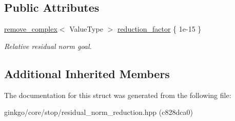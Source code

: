 \subsection*{Public Attributes}
\begin{DoxyCompactItemize}
\item 
\mbox{\label{structgko_1_1stop_1_1ResidualNormReduction_1_1parameters__type_a488ffd39d7ea7fc9093a0e7604be2746}} 
\hyperlink{namespacegko_adfcb75c44f6b6c701989419c166f6e7e}{remove\+\_\+complex}$<$ Value\+Type $>$ \hyperlink{structgko_1_1stop_1_1ResidualNormReduction_1_1parameters__type_a488ffd39d7ea7fc9093a0e7604be2746}{reduction\+\_\+factor} \{ 1e-\/15 \}
\begin{DoxyCompactList}\small\item\em Relative residual norm goal. \end{DoxyCompactList}\end{DoxyCompactItemize}
\subsection*{Additional Inherited Members}


The documentation for this struct was generated from the following file\+:\begin{DoxyCompactItemize}
\item 
ginkgo/core/stop/residual\+\_\+norm\+\_\+reduction.\+hpp (c828dca0)\end{DoxyCompactItemize}
